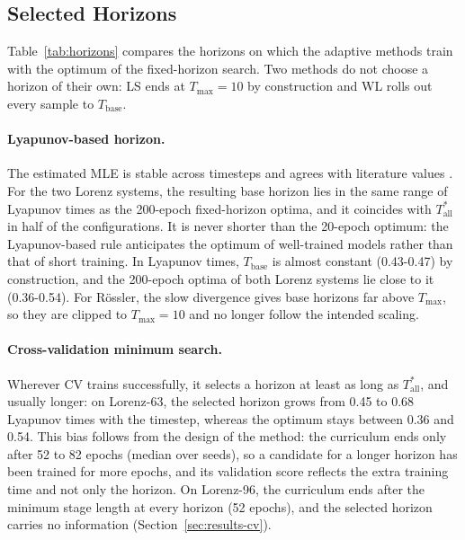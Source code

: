 \documentclass{article}
\begin{document}
\subsection{Selected Horizons}
\label{sec:results-horizons}

Table~\ref{tab:horizons} compares the horizons on which the adaptive methods train with the optimum of the fixed-horizon search. Two methods do not choose a horizon of their own: LS ends at $T_{\max} = 10$ by construction and WL rolls out every sample to $T_{\mathrm{base}}$.



\paragraph{Lyapunov-based horizon.}
The estimated MLE is stable across timesteps and agrees with literature values \cite{geurts_lyapunov_2020, karimi_extensive_2010, ayers_supervised_2023}. For the two Lorenz systems, the resulting base horizon lies in the same range of Lyapunov times as the 200-epoch fixed-horizon optima, and it coincides with $T^*_{\mathrm{all}}$ in half of the configurations. It is never shorter than the 20-epoch optimum: the Lyapunov-based rule anticipates the optimum of well-trained models rather than that of short training. In Lyapunov times, $T_{\mathrm{base}}$ is almost constant (0.43-0.47) by construction, and the 200-epoch optima of both Lorenz systems lie close to it (0.36-0.54). For Rössler, the slow divergence gives base horizons far above $T_{\max}$, so they are clipped to $T_{\max} = 10$ and no longer follow the intended scaling.

\paragraph{Cross-validation minimum search.}
Wherever CV trains successfully, it selects a horizon at least as long as $T^*_{\mathrm{all}}$, and usually longer: on Lorenz-63, the selected horizon grows from 0.45 to 0.68 Lyapunov times with the timestep, whereas the optimum stays between 0.36 and 0.54. This bias follows from the design of the method: the curriculum ends only after 52 to 82 epochs (median over seeds), so a candidate for a longer horizon has been trained for more epochs, and its validation score reflects the extra training time and not only the horizon. On Lorenz-96, the curriculum ends after the minimum stage length at every horizon (52 epochs), and the selected horizon carries no information (Section~\ref{sec:results-cv}).
\end{document}
